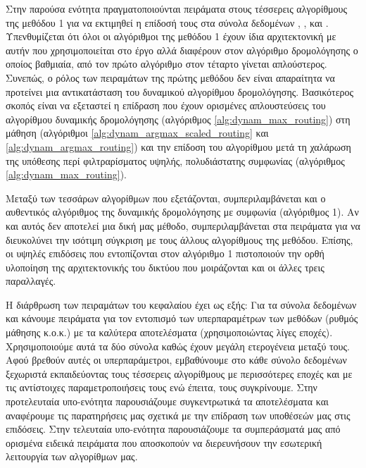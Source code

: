 Στην παρούσα ενότητα πραγματοποιούνται πειράματα στους τέσσερεις αλγορίθμους της μεθόδου 1 για να εκτιμηθεί η επίδοσή τους στα σύνολα δεδομένων \cite{deng2012mnist}, \cite{Xiao2017FashionMNISTAN}, \cite{CIFAR10} και \cite{lecun2004learning}. Υπενθυμίζεται ότι όλοι οι αλγόριθμοι της μεθόδου 1 έχουν ίδια αρχιτεκτονική με αυτήν που χρησιμοποιείται στο έργο \cite{sabour2017dynamic} αλλά διαφέρουν στον αλγόριθμο δρομολόγησης ο οποίος βαθμιαία, από τον πρώτο αλγόριθμο στον τέταρτο γίνεται απλούστερος. Συνεπώς, ο ρόλος των πειραμάτων της πρώτης μεθόδου δεν είναι απαραίτητα να προτείνει μια αντικατάσταση του δυναμικού αλγορίθμου δρομολόγησης. Βασικότερος σκοπός είναι να εξεταστεί η επίδραση που έχουν ορισμένες απλουστεύσεις του αλγορίθμου δυναμικής δρομολόγησης (αλγόριθμος \ref{alg:dynam_max_routing}) στη μάθηση (αλγόριθμοι \ref{alg:dynam_argmax_scaled_routing} και \ref{alg:dynam_argmax_routing}) και την επίδοση του αλγορίθμου μετά τη χαλάρωση της υπόθεσης περί φιλτραρίσματος υψηλής, πολυδιάστατης συμφωνίας (αλγόριθμος \ref{alg:dynam_max_routing}).\par

Μεταξύ των τεσσάρων αλγορίθμων που εξετάζονται, συμπεριλαμβάνεται και ο αυθεντικός αλγόριθμος της δυναμικής δρομολόγησης με συμφωνία (αλγόριθμος 1). Αν και αυτός δεν αποτελεί μια δική μας μέθοδο, συμπεριλαμβάνεται στα πειράματα για να διευκολύνει την ισότιμη σύγκριση με τους άλλους αλγορίθμους της μεθόδου. Επίσης, οι υψηλές επιδόσεις που εντοπίζονται στον αλγόριθμο 1 πιστοποιούν την ορθή υλοποίηση της αρχιτεκτονικής του δικτύου που μοιράζονται και οι άλλες τρεις παραλλαγές.\par

Η διάρθρωση των πειραμάτων του κεφαλαίου έχει ως εξής: Για τα σύνολα δεδομένων  και  κάνουμε πειράματα για τον εντοπισμό των υπερπαραμέτρων των μεθόδων (ρυθμός μάθησης κ.ο.κ.) με τα καλύτερα αποτελέσματα (χρησιμοποιώντας λίγες εποχές). Χρησιμοποιούμε αυτά τα δύο σύνολα καθώς έχουν μεγάλη ετερογένεια μεταξύ τους. Αφού βρεθούν αυτές οι υπερπαράμετροι, εμβαθύνουμε στο κάθε σύνολο δεδομένων ξεχωριστά εκπαιδεύοντας τους τέσσερεις αλγορίθμους με περισσότερες εποχές και με τις αντίστοιχες παραμετροποιήσεις τους ενώ έπειτα, τους συγκρίνουμε. Στην προ\textendash τελευταία υπο-ενότητα παρουσιάζουμε συγκεντρωτικά τα αποτελέσματα και αναφέρουμε τις παρατηρήσεις μας σχετικά με την επίδραση των υποθέσεών μας στις επιδόσεις. Στην τελευταία υπο-ενότητα παρουσιάζουμε τα συμπεράσματά μας από ορισμένα ειδεικά πειράματα που αποσκοπούν να διερευνήσουν την εσωτερική λειτουργία των αλγορίθμων μας.\par

